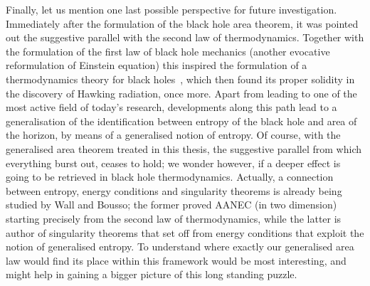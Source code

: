 Finally, let us mention one last possible perspective for future investigation. Immediately after the formulation of the black hole area theorem, it was pointed out the suggestive parallel with the second law of thermodynamics. Together with the formulation of the first law of black hole mechanics (another evocative reformulation of Einstein equation) this inspired the formulation of a thermodynamics theory for black holes~\cite[]{bardeen1973four}, which then found its proper solidity in the discovery of Hawking radiation, once more.
Apart from leading to one of the most active field of today's research, developments along this path lead to a generalisation of the identification between entropy of the black hole and area of the horizon, by means of a generalised notion of entropy.
Of course, with the generalised area theorem treated in this thesis, the suggestive parallel from which everything burst out, ceases to hold; we wonder however, if a deeper effect is going to be retrieved in black hole thermodynamics. 
Actually, a connection between entropy, energy conditions and singularity theorems is already being studied by Wall and Bousso; the former proved AANEC (in two dimension) starting precisely from the second law of thermodynamics, while the latter is author of singularity theorems that set off from energy conditions that exploit the notion of generalised entropy. To understand where exactly our generalised area law would find its place within this framework would be most interesting, and might help in gaining a bigger picture of this long standing puzzle.
